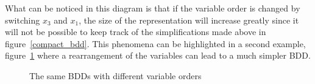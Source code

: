 \documentclass[12pt]{report}
\begin{document}
What can be noticed in this diagram is that if the variable order is changed by switching $x_3$ and $x_1$, the size of the representation will increase greatly since it will not be possible to keep track of the simplifications made above in figure~\ref{compact_bdd}. This phenomena can be highlighted in a second example, figure~\ref{reduction_bdd} where a rearrangement of the variables can lead to a much simpler BDD.

\begin{figure}[!h]
  \centering
  \caption{The same BDDs with different variable orders}
  \label{reduction_bdd}
\end{figure}
\end{document}
